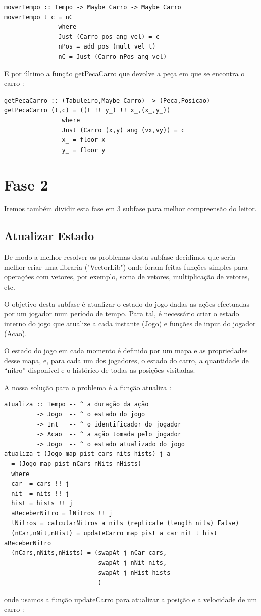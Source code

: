 \documentclass[a4paper]{report} %
\begin{document}
\begin{verbatim}
moverTempo :: Tempo -> Maybe Carro -> Maybe Carro
moverTempo t c = nC
               where
               Just (Carro pos ang vel) = c
               nPos = add pos (mult vel t)
               nC = Just (Carro nPos ang vel)
\end{verbatim}
E por último a função getPecaCarro que devolve a peça em que se encontra o carro :

\begin{verbatim}
getPecaCarro :: (Tabuleiro,Maybe Carro) -> (Peca,Posicao)
getPecaCarro (t,c) = ((t !! y_) !! x_,(x_,y_))
                where
                Just (Carro (x,y) ang (vx,vy)) = c
                x_ = floor x
                y_ = floor y
\end{verbatim}



\section{Fase 2}

Iremos também dividir esta fase em 3 subfase para melhor compreensão do leitor.

\subsection{Atualizar Estado}

De modo a melhor resolver os problemas desta subfase decidimos que seria melhor criar uma libraria ("VectorLib") onde foram feitas funções simples para operações com vetores, por exemplo, soma de vetores, multiplicação de vetores, etc.

O objetivo desta subfase é atualizar o estado do jogo dadas as ações efectuadas por um jogador num período de tempo. Para tal, é necessário criar o estado interno do jogo que atualize a cada instante (Jogo) e funções de input do jogador (Acao).

O estado do jogo em cada momento é definido por um mapa e as propriedades desse mapa, e, para cada um dos jogadores, o estado do carro, a quantidade de “nitro” disponível e o histórico de todas as posições visitadas.

A nossa solução para o problema é a função atualiza :

\begin{verbatim}
atualiza :: Tempo -- ^ a duração da ação
         -> Jogo  -- ^ o estado do jogo
         -> Int   -- ^ o identificador do jogador
         -> Acao  -- ^ a ação tomada pelo jogador
         -> Jogo  -- ^ o estado atualizado do jogo
atualiza t (Jogo map pist cars nits hists) j a
  = (Jogo map pist nCars nNits nHists)
  where
  car  = cars !! j
  nit  = nits !! j
  hist = hists !! j
  aReceberNitro = lNitros !! j
  lNitros = calcularNitros a nits (replicate (length nits) False)
  (nCar,nNit,nHist) = updateCarro map pist a car nit t hist aReceberNitro
  (nCars,nNits,nHists) = (swapAt j nCar cars,
                          swapAt j nNit nits,
                          swapAt j nHist hists
                          )
\end{verbatim}
onde usamos a função updateCarro para atualizar a posição e a velocidade de um carro :
\end{document}
